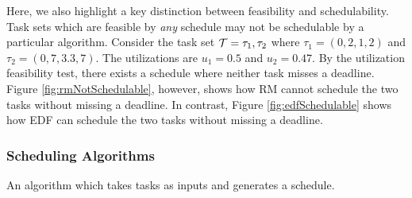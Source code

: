 Here, we also highlight a key distinction between feasibility and schedulability.
Task sets which are feasible by \textit{any} schedule may not be schedulable by a particular algorithm.
Consider the task set $\mathcal{T} = {\tau_1, \tau_2}$ where $\tau_1 = (0,2,1,2)$ and $\tau_2 = (0,7,3.3,7)$.
The utilizations are $u_1 = 0.5$ and $u_2 = 0.47$.
By the utilization feasibility test, there exists a schedule where neither task misses a deadline.
Figure \ref{fig:rmNotSchedulable}, however, shows how RM cannot schedule the two tasks without missing a deadline.
In contrast, Figure \ref{fig:edfSchedulable} shows how EDF can schedule the two tasks without missing a deadline.



\subsubsection{Scheduling Algorithms}

An algorithm which takes tasks as inputs and generates a schedule.



